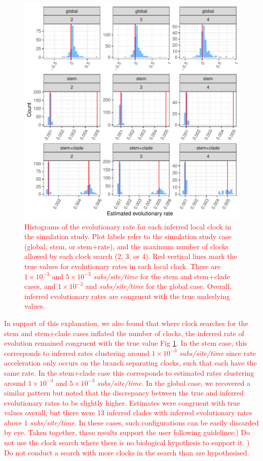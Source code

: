 \documentclass{article}
\begin{document}
\begin{figure}[H]
\centering
\includegraphics[width = 0.8\linewidth]{clockError.pdf}
\caption{\textcolor{red}{Histograms of the evolutionary rate for each inferred local clock in the simulation study. Plot labels refer to the simulation study case (global, stem, or stem+rate), and the maximum number of clocks allowed by each clock search (2, 3, or 4). Red vertical lines mark the true values for evolutionary rates in each local clock. These are $1\times10^{-3}$ and $5\times10^{-3}$ \textit{subs/site/time} for the stem and stem+clade cases, and $1\times10^{-3}$ and \textit{subs/site/time} for the global case. Overall, inferred evolutionary rates are congruent with the true underlying values.}}
\label{fig:clockError}
\end{figure}

\textcolor{red}{In support of this explanation, we also found that where clock searches for the stem and stem+clade cases inflated the number of clocks, the inferred rate of evolution remained congruent with the true value Fig \ref{fig:clockError}. In the stem case, this corresponds to inferred rates clustering around $1\times10^{-3}$ \textit{subs/site/time} since rate acceleration only occurs on the branch separating clocks, such that each have the same rate. In the stem+clade case this corresponds to estimated rates clustering around $1\times10^{-3}$ and $5\times10^{-3}$ \textit{subs/site/time}. In the global case, we recovered a similar pattern but noted that the discrepancy between the true and inferred evolutionary rates to be slightly higher. Estimates were congruent with true values overall, but there were 13 inferred clades with inferred evolutionary rates above $1$ \textit{subs/site/time}. In these cases, such configurations can be easily discarded by eye. Taken together, these results support the user following guidelines:) Do not use the clock search where there is no biological hypothesis to support it. ) Do not conduct a search with more clocks in the search than are hypothesised.}
\end{document}
